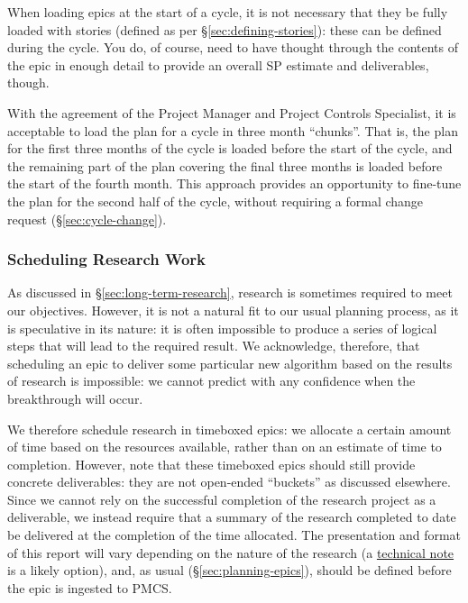 When loading epics at the start of a cycle, it is not necessary that
they be fully
loaded with stories (defined as per \S\ref{sec:defining-stories}): these
can be defined during the cycle. You do, of course, need to have thought
through the contents of the epic in enough detail to provide an overall
SP estimate and deliverables, though.

With the agreement of the Project Manager and Project Controls
Specialist, it is acceptable to load the plan for a cycle in three month
``chunks''. That is, the plan for the first three months of the cycle is
loaded before the start of the cycle, and the remaining part of the plan
covering the final three months is loaded before the start of the fourth
month. This approach provides an opportunity to fine-tune the plan for
the second half of the cycle, without requiring a formal
change request (\S\ref{sec:cycle-change}).

\subsubsection{Scheduling Research Work}\label{scheduling-research-work}

As discussed in \S\ref{sec:long-term-research}, research is sometimes required
to meet our objectives. However, it is not a natural fit to our usual
planning process, as it is speculative in its nature: it is often
impossible to produce a series of logical steps that will lead to the
required result. We acknowledge, therefore, that scheduling an epic to
deliver some particular new algorithm based on the results of research
is impossible: we cannot predict with any confidence when the
breakthrough will occur.

We therefore schedule research in timeboxed epics: we allocate a certain
amount of time based on the resources available, rather than on an
estimate of time to completion. However, note that these timeboxed epics
should still provide concrete deliverables: they are not open-ended
``buckets'' as discussed elsewhere. Since we cannot rely on the
successful completion of the research project as a deliverable, we
instead require that a summary of the research completed to date be
delivered at the completion of the time allocated. The presentation and
format of this report will vary depending on the nature of the research
(a \href{https://sqr-000.lsst.io/}{technical note} is a likely option),
and, as usual (\S\ref{sec:planning-epics}), should be
defined before the epic is ingested to PMCS.

